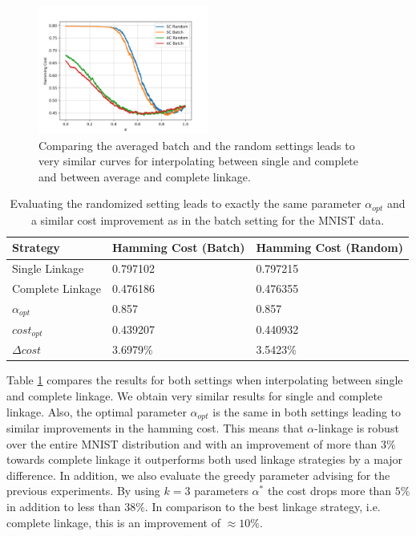 \begin{figure}[h]
    \centering
    \includegraphics[width=0.5\textwidth]{plots/mnist_1000.png}
    \caption{Comparing the averaged batch and the random settings leads to very similar curves for interpolating between single and complete and between average and complete linkage.}
    \label{fig:mnistscrandom}
\end{figure}

\begin{table}[H]
    \centering
    \begin{tabular}{|l | l | l |}
    \hline
    Strategy & Hamming Cost (Batch) & Hamming Cost (Random)\\ \hline
    Single Linkage & 0.797102 & 0.797215\\
    Complete Linkage & 0.476186 & 0.476355\\
    $\alpha_{opt}$ & 0.857 & 0.857\\
    $cost_{opt}$ & 0.439207 & 0.440932\\
    $\Delta cost$ & 3.6979\% & 3.5423\%\\\hline
    \end{tabular}
    \caption{Evaluating the randomized setting leads to exactly the same parameter $\alpha_{opt}$ and a similar cost improvement as in the batch setting for the MNIST data.}
    \label{table:mnist1000randomsc}
\end{table}

Table \ref{table:mnist1000randomsc} compares the results for both settings when interpolating between single and complete linkage. We obtain very similar results for single and complete linkage. Also, the optimal parameter $\alpha_{opt}$ is the same in both settings leading to similar improvements in the hamming cost. This means that $\alpha$-linkage is robust over the entire MNIST distribution and with an improvement of more than $3\%$ towards complete linkage it outperforms both used linkage strategies by a major difference. In addition, we also evaluate the greedy parameter advising for the previous experiments. By using $k = 3$ parameters $\alpha^*$ the cost drops more than $5\%$ in addition to less than $38\%$. In comparison to the best linkage strategy, i.e. complete linkage, this is an improvement of $\approx 10\%$.\\

